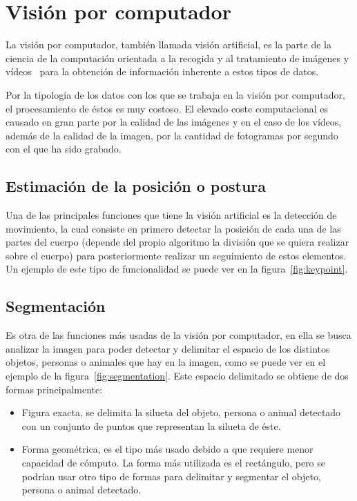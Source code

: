 \section{Visión por computador}
La visión por computador, también llamada visión artificial, es la parte de la ciencia de la computación orientada a la recogida y al tratamiento de imágenes y vídeos~\cite{wiki:visionartifical,cnn} para la obtención de información inherente a estos tipos de datos.

Por la tipología de los datos con los que se trabaja en la visión por computador, el procesamiento de éstos es muy costoso. El elevado coste computacional es causado en gran parte por la calidad de las imágenes y en el caso de los vídeos, además de la calidad de la imagen, por la cantidad de fotogramas por segundo con el que ha sido grabado.

\subsection{Estimación de la posición o postura}
Una de las principales funciones que tiene la visión artificial es la detección de movimiento, la cual consiste en primero detectar la posición de cada una de las partes del cuerpo (depende del propio algoritmo la división que se quiera realizar sobre el cuerpo) para posteriormente realizar un seguimiento de estos elementos. Un ejemplo de este tipo de funcionalidad se puede ver en la figura~\ref{fig:keypoint}.

\subsection{Segmentación}
Es otra de las funciones más usadas de la visión por computador, en ella se busca analizar la imagen para poder detectar y delimitar el espacio de los distintos objetos, personas o animales que hay en la imagen, como se puede ver en el ejemplo de la figura~\ref{fig:segmentation}. Este espacio delimitado se obtiene de dos formas principalmente:
\begin{itemize}
	\item Figura exacta, se delimita la silueta del objeto, persona o animal detectado con un conjunto de puntos que representan la silueta de éste.
	\item Forma geométrica, es el tipo más usado debido a que requiere menor capacidad de cómputo. La forma más utilizada es el rectángulo, pero se podrían usar otro tipo de formas para delimitar y segmentar el objeto, persona o animal detectado.
\end{itemize}


